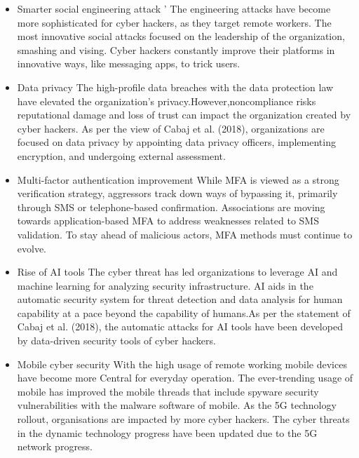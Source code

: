 \begin{itemize}
	 \item Smarter social engineering attack '
    The engineering attacks have become more sophisticated for cyber hackers, as they target 
    remote workers. The most innovative social attacks focused on the leadership of the 
    organization, smashing and vising. Cyber hackers constantly
    improve their platforms in innovative ways, like messaging apps, to trick users.
	\item Data privacy
    The high-profile data breaches with the data protection law have elevated the 
    organization's privacy.However,noncompliance risks reputational damage and loss of trust 
    can impact the organization created by cyber hackers. As per the view of Cabaj et al. 
    (2018), organizations are focused on data privacy by appointing data privacy officers, 
    implementing encryption, and undergoing external assessment.
	\item Multi-factor authentication improvement
    While MFA is viewed as a strong verification strategy, aggressors track down ways of 
    bypassing it, primarily through SMS or telephone-based confirmation. Associations are 
    moving towards application-based MFA to address weaknesses related to SMS validation. To 
    stay ahead of malicious actors, MFA methods must continue to evolve.
	\item Rise of AI tools
    The cyber threat has led organizations to leverage AI and machine learning for analyzing 
    security infrastructure. AI aids in the automatic security system for threat detection and 
    data analysis for human capability at a pace beyond the capability of humans.As per the 
    statement of Cabaj et al. (2018), the automatic attacks for AI tools have been developed by 
    data-driven security tools of cyber hackers.
	\item Mobile cyber security
    With the high usage of remote working mobile devices have become
   more Central for everyday operation. The ever-trending usage of mobile has improved the 
   mobile threads that include spyware security vulnerabilities with the malware software of 
   mobile. As the 5G technology rollout, organisations are impacted by more cyber hackers. The 
   cyber threats in the dynamic technology progress have been updated due to the 5G network 
   progress.
\end{itemize}



